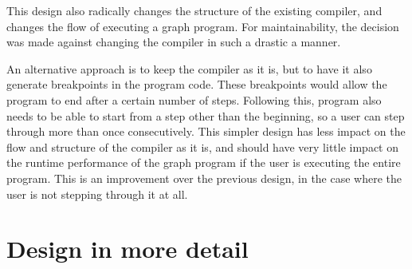 \documentclass{UoYCSproject}
\begin{document}
This design also radically changes the structure of the existing compiler, and changes the flow of executing a graph program. For maintainability, the decision was made against changing the compiler in such a drastic a manner.

An alternative approach is to keep the compiler as it is, but to have it also generate breakpoints in the program code. These breakpoints would allow the program to end after a certain number of steps. Following this, program also needs to be able to start from a step other than the beginning, so a user can step through more than once consecutively. This simpler design has less impact on the flow and structure of the compiler as it is, and should have very little impact on the runtime performance of the graph program if the user is executing the entire program. This is an improvement over the previous design, in the case where the user is not stepping through it at all.




\section{Design in more detail} %

\end{document}
